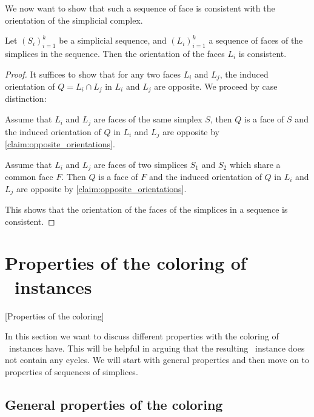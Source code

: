 We now want to show that such a sequence of face is consistent with the orientation of the simplicial complex.
\begin{proposition}
    \label{prop:orientation_of_sequences_of_faces}
    Let $\left(S_i\right)_{i=1}^{k}$ be a simplicial sequence, and $\left(L_i\right)_{i=1}^{k}$ a sequence of faces of the simplices in the sequence. Then the orientation of the faces $L_i$ is consistent.
\end{proposition}
\begin{proof}
    It suffices to show that for any two faces $L_i$ and $L_j$, the induced orientation of $Q = L_i \cap L_j$ in $L_i$ and $L_j$ are opposite. We proceed by case distinction:
    \begin{case}{1}
        Assume that $L_i$ and $L_j$ are faces of the same simplex $S$, then $Q$ is a face of $S$ and the induced orientation of $Q$ in $L_i$ and $L_j$ are opposite by \cref{claim:opposite_orientations}.
    \end{case}
    \begin{case}{2}
        Assume that $L_i$ and $L_j$ are faces of two simplices $S_1$ and $S_2$ which share a common face $F$. Then $Q$ is a face of $F$ and the induced orientation of $Q$ in $L_i$ and $L_j$ are opposite by \cref{claim:opposite_orientations}.
    \end{case}
    This shows that the orientation of the faces of the simplices in a sequence is consistent.
\end{proof}

\section{Properties of the coloring of \Tarski\ instances}[Properties of the coloring]

In this section we want to discuss different properties with the coloring of \Tarski\ instances have. This will be helpful in arguing that the resulting \EndOfLine\ instance does not contain any cycles. We will start with general properties and then move on to properties of sequences of simplices.

\subsection{General properties of the coloring}

